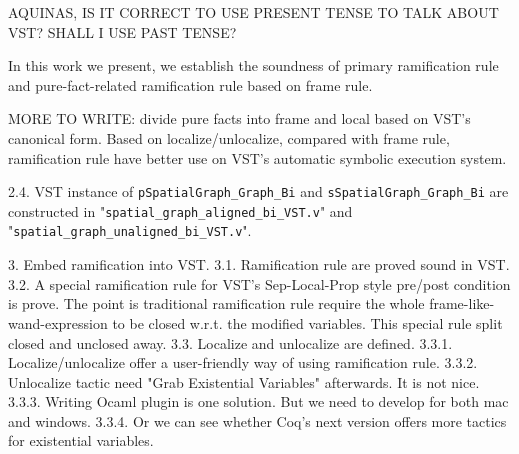 AQUINAS, IS IT CORRECT TO USE PRESENT TENSE TO TALK ABOUT VST? SHALL I USE PAST TENSE?

In this work we present, we establish the soundness of primary ramification rule and pure-fact-related ramification rule based on frame rule. 	


MORE TO WRITE: divide pure facts into frame and local based on VST's canonical form. Based on localize/unlocalize, compared with frame rule, ramification rule have better use on VST's automatic symbolic execution system.





2.4. VST instance of \texttt{pSpatialGraph\_Graph\_Bi} and \texttt{sSpatialGraph\_Graph\_Bi} are constructed in "\texttt{spatial\_graph\_aligned\_bi\_VST.v}" and "\texttt{spatial\_graph\_unaligned\_bi\_VST.v}".

3. Embed ramification into VST.
3.1. Ramification rule are proved sound in VST.
3.2. A special ramification rule for VST's Sep-Local-Prop style pre/post condition is prove. The point is traditional ramification rule require the whole frame-like-wand-expression to be closed w.r.t. the modified variables. This special rule split closed and unclosed away.
3.3. Localize and unlocalize are defined.
3.3.1. Localize/unlocalize offer a user-friendly way of using ramification rule.
3.3.2. Unlocalize tactic need "Grab Existential Variables" afterwards. It is not nice.
3.3.3. Writing Ocaml plugin is one solution. But we need to develop for both mac and windows.
3.3.4. Or we can see whether Coq's next version offers more tactics for existential variables.
